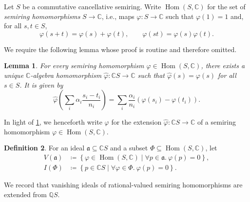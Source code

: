 \documentclass[11pt]{scrartcl}
\theoremstyle{definition}
\newtheorem{definition}{Definition}[section]
\theoremstyle{plain}
\newtheorem{lemma}[definition]{Lemma}
\theoremstyle{remark}
\renewcommand\phi\varphi
\DeclareMathOperator\Hom{Hom}
\newcommand{\C}{\mathbb{C}}
\begin{document}
	Let $S$ be a commutative cancellative semiring.
	Write $\Hom(S, \mathbb{C})$ for the set of \emph{semiring homomorphisms} $S \to \mathbb{C}$, i.e., maps $\phi \colon S\to \mathbb{C}$ such that $\phi(1) = 1$ and, for all $s, t\in S$,
	\[
		\phi(s + t) = \phi(s) + \phi(t), \qquad \phi(st) = \phi(s) \phi(t).
	\]

    We require the following lemma whose proof is routine and therefore omitted.

	\begin{lemma}\label{lem:unique-extension}
		For every semiring homomorphism $\phi \in \Hom(S, \mathbb{C})$,
		there exists a unique $\mathbb{C}$-algebra homomorphism $\widehat{\phi} \colon \mathbb{C}S\to \mathbb{C}$ such that $\widehat{\phi}(s) = \phi(s)$ for all $s\in S$.
		It is given by
		\begin{equation}\label{eq:phi-hat}
			\widehat{\phi}\left(\sum_i \alpha_i \frac{s_i - t_i}{n_i}\right) = \sum_i \frac{\alpha_i}{n_i}\left(\phi(s_i) - \phi(t_i)\right).
		\end{equation}
	\end{lemma}
























	In light of \cref{lem:unique-extension},
	we henceforth write $\phi$ for the extension $\widehat\phi \colon \C S \to \C$ of a semiring homomorphism $\phi \in \Hom(S, \mathbb{C})$.

	\begin{definition}
		For an ideal $\mathfrak{a} \subseteq \mathbb{C}S$ and a subset $\Phi \subseteq \Hom(S, \mathbb{C})$, let
		\begin{align*}
			V(\mathfrak{a}) & \coloneqq \left\{\phi \in \Hom(S, \mathbb{C}) \mid \forall p \in \mathfrak{a}.\ \phi(p) = 0 \right\}, \\
			I(\Phi) & \coloneqq \left\{p \in \mathbb{C}S \mid \forall \phi \in \Phi.\ \phi(p) = 0 \right\}.
		\end{align*}
	\end{definition}

	We record that vanishing ideals of rational-valued semiring homomorphisms
	are extended from $\mathbb{Q}S$.
\end{document}
